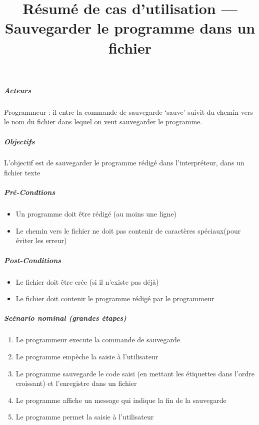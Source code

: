 \title{Résumé de cas d'utilisation --- Sauvegarder le programme dans un fichier}
        \subparagraph{Acteurs}
        Programmeur : il entre la commande de sauvegarde `sauve' suivit du chemin vers le nom du fichier dans lequel on veut sauvegarder le programme.

        \subparagraph{Objectifs}
        L'objectif est de sauvegarder le programme rédigé dans l'interpréteur, dans un fichier texte

            \subparagraph{Pré-Condtions}
            \begin{itemize}
            	\item Un programme doit être rédigé (au moins une ligne)
            	\item Le chemin vers le fichier ne doit pas contenir de caractères spéciaux(pour éviter les erreur)
        	\end{itemize}

            \subparagraph{Post-Conditions}
            \begin{itemize}
            	\item Le fichier doit être crée (si il n'existe pas déjà)
            	\item Le fichier doit contenir le programme rédigé par le programmeur
            \end{itemize}

        \subparagraph{Scénario nominal (grandes étapes)}
        \begin{enumerate}
        	\item Le programmeur execute la commande de sauvegarde
        	\item Le programme empèche la saisie à l'utilisateur
        	\item Le programme sauvegarde le code saisi (en mettant les étiquettes dans l'ordre croissant) et l'enregistre dans un fichier
        	\item Le programme affiche un message qui indique la fin de la sauvegarde
        	\item Le programme permet la saisie à l'utilisateur
    	\end{enumerate}

